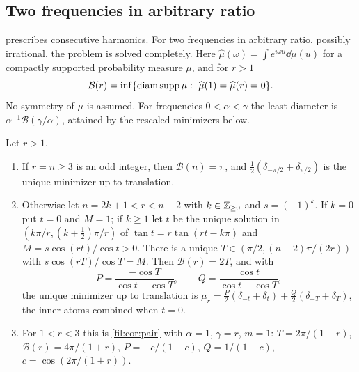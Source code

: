 \subsection{Two frequencies in arbitrary ratio}\label{fil:sec:two}

 prescribes consecutive harmonics. For two frequencies in arbitrary ratio, possibly
irrational, the problem is solved completely. Here $\widehat\mu(\omega)=\int e^{i\omega u}\dd\mu(u)$ for a compactly
supported probability measure $\mu$, and for $r>1$
\[
 \mathcal B(r)=\inf\set{\operatorname{diam}\supp\mu:\ \widehat\mu(1)=\widehat\mu(r)=0}.
\]
No symmetry of $\mu$ is assumed. For frequencies $0<\alpha<\gamma$ the least diameter is $\alpha^{-1}\mathcal B(\gamma/\alpha)$,
attained by the rescaled minimizers below.

\begin{theorem}\label{rec:thm:twofreq}
Let $r>1$.
\begin{enumerate}
\item If $r=n\ge3$ is an odd integer, then $\mathcal B(n)=\pi$, and $\tfrac12(\delta_{-\pi/2}+\delta_{\pi/2})$ is the unique
minimizer up to translation.
\item Otherwise let $n=2k+1<r<n+2$ with $k\in\mathbb{Z}_{\ge0}$ and $s=(-1)^k$. If $k=0$ put $t=0$ and $M=1$; if $k\ge1$ let $t$
be the unique solution in $(k\pi/r,(k+\tfrac12)\pi/r)$ of $\tan t=r\tan(rt-k\pi)$ and $M=s\cos(rt)/\cos t>0$.
There is a unique $T\in(\pi/2,(n+2)\pi/(2r))$ with $s\cos(rT)/\cos T=M$. Then $\mathcal B(r)=2T$, and with
\[
 P=\frac{-\cos T}{\cos t-\cos T},\qquad Q=\frac{\cos t}{\cos t-\cos T},
\]
the unique minimizer up to translation is $\mu_r=\tfrac P2(\delta_{-t}+\delta_t)+\tfrac Q2(\delta_{-T}+\delta_T)$, the inner
atoms combined when $t=0$.
\item For $1<r<3$ this is \cref{fil:cor:pair} with $\alpha=1$, $\gamma=r$, $m=1$: $T=2\pi/(1+r)$,
$\mathcal B(r)=4\pi/(1+r)$, $P=-c/(1-c)$, $Q=1/(1-c)$, $c=\cos(2\pi/(1+r))$.
\end{enumerate}
\end{theorem}

